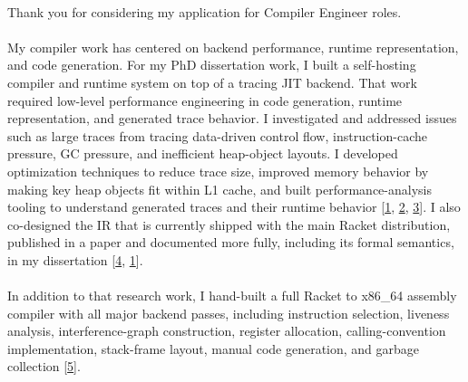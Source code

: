 

\newcommand{\dissertationurl}{https://github.com/cderici/dissertation/releases/download/latest-pdf/thesis.pdf}
\newcommand{\pycketperfurl}{https://github.com/cderici/pycket-performance}
\newcommand{\tracedrawurl}{https://github.com/cderici/trace-draw}
\newcommand{\raxurl}{https://github.com/cderici/rax}
\newcommand{\icfpreporturl}{https://dl.acm.org/doi/10.1145/3341642}
\newcommand{\atwurl}{https://github.com/cderici/around-the-world-in-26-languages}
\newcommand{\homelaburl}{https://home.dericilab.live/homelab/}
\newcommand{\edinburghurl}{https://github.com/cderici/around-the-world-in-compilers/blob/main/langs/edinburgh/README.md}
\newcommand{\dublinlang}{https://github.com/cderici/around-the-world-in-compilers/blob/main/langs/dublin/README.md}




\paragraph{} %
Thank you for considering my application for Compiler Engineer roles.

\paragraph{} %
My compiler work has centered on backend performance, runtime representation, and code generation. For my PhD dissertation work, I built a self-hosting compiler and runtime system on top of a tracing JIT backend. That work required low-level performance engineering in code generation, runtime representation, and generated trace behavior. I investigated and addressed issues such as large traces from tracing data-driven control flow, instruction-cache pressure, GC pressure, and inefficient heap-object layouts. I developed optimization techniques to reduce trace size, improved memory behavior by making key heap objects fit within L1 cache, and built performance-analysis tooling to understand generated traces and their runtime behavior [\href{\dissertationurl}{1}, \href{\pycketperfurl}{2}, \href{\tracedrawurl}{3}]. I also co-designed the IR that is currently shipped with the main Racket distribution, published in a paper and documented more fully, including its formal semantics, in my dissertation [\href{\icfpreporturl}{4}, \href{\dissertationurl}{1}].

\paragraph{} %
In addition to that research work, I hand-built a full Racket to x86\_64 assembly compiler with all major backend passes, including instruction selection, liveness analysis, interference-graph construction, register allocation, calling-convention implementation, stack-frame layout, manual code generation, and garbage collection [\href{\raxurl}{5}].

